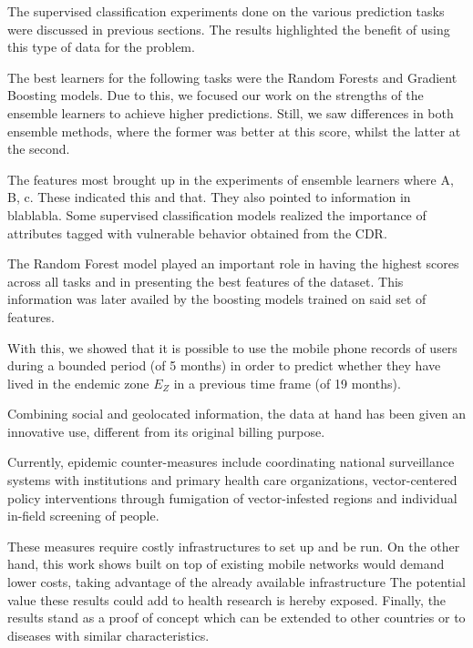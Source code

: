 The supervised classification experiments done on the various prediction tasks were discussed in previous sections.
The results highlighted the benefit of using this type of data for the problem.


The best learners for the following tasks were the Random Forests and Gradient Boosting models.
Due to this, we focused our work on the strengths of the ensemble learners to achieve higher predictions.
Still, we saw differences in both ensemble methods, where the former was better at this score, whilst the latter at the second.


The features most brought up in the experiments of ensemble learners where A, B, c.
These indicated this and that.
They also pointed to information in  blablabla.
Some supervised classification models realized the importance of attributes tagged with vulnerable behavior obtained from the CDR.\@

The Random Forest model played an important role in having the highest scores across all tasks and in presenting the best features of the dataset.
This information was later availed by the boosting models trained on said set of features.



With this, we showed that it is possible to use the mobile phone records of users during a bounded period (of 5 months) in order to predict whether they have lived in the endemic zone $E_Z$ in a previous time frame (of 19 months).

Combining social and geolocated information, the data at hand has been given an innovative use, different from its original billing purpose.



Currently, epidemic counter-measures include coordinating national surveillance systems with institutions and primary health care organizations, vector-centered policy interventions through fumigation of vector-infested regions and individual in-field screening of people.

These measures require costly infrastructures to set up and be run.
On the other hand, this work shows built on top of existing mobile networks would demand lower costs, taking advantage of the already available infrastructure
The potential value these results could add to health research is hereby exposed.
Finally, the results stand as a proof of concept which can be extended to other countries or to diseases with similar characteristics.


